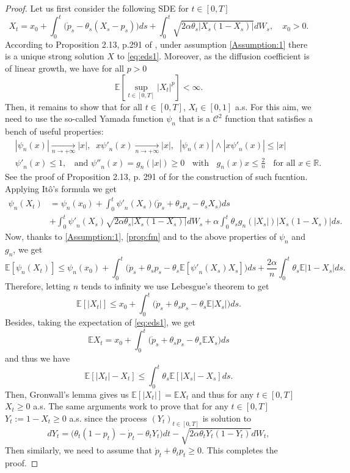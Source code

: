 \documentclass[11pt]{article}
\theoremstyle{definition}
\begin{document}
\begin{proof}
Let us first consider the following SDE for $t\in[0,T]$
\begin{equation}\label{eq:eds1}
X_t=x_0+  \int_0^t\big(\dot p_s - \theta_s(X_s-p_s)  \big)ds  + \int_0^t\sqrt{2\alpha \theta_s|X_s(1-X_s)|} dW_s, \quad x_0>0.
\end{equation}
According to Proposition 2.13, p.291 of \cite{KarShr}, under assumption  \eqref{Assumption:1} there is a unique strong solution $X$ to \eqref{eq:eds1}. Moreover, as the diffusion coefficient is of linear growth, we have  for all $p>0$ 
\begin{equation}\label{prop:fm}
\mathbb E[ \sup_{t\in[0,T]}|X_t|^p]<\infty.
\end{equation}
Then, it remains to show that for all $t\in[0,T]$, $X_t\in[0,1]$ a.s. For this aim, we need to use the so-called Yamada function $\psi_n$ that is a $\mathcal C^2$ function that satisfies a bench of useful properties:
\begin{align*}
&|\psi_n(x)|\underset{n\rightarrow+\infty}{\rightarrow}|x|, \;\; x{\psi'}_n(x)\underset{n\rightarrow+\infty}{\rightarrow}|x|, \;\; |\psi_n(x)|\wedge |x{\psi'}_n(x)| \le |x|\\
&{\psi'}_n(x)\le 1, \;\; \mbox{ and } {\psi''}_n(x)=g_n(|x|)\ge 0\;\; \mbox{ with } \;\; g_n(x)x\le \frac 2n\;\;  \mbox{ for all } x\in \mathbb R .
\end{align*}
See the proof of Proposition 2.13, p. 291 of \cite{KarShr} for the construction of such fucntion.
Applying Itô's formula we get
\begin{align*}
\psi_n(X_t)&=\psi_n(x_0) +\int_0^t {\psi'}_n(X_s)(\dot p_s + \theta_s p_s - \theta_sX_s  \big)ds \\
&+ \int_0^t{\psi'}_n(X_s)\sqrt{2\alpha \theta_s|X_s(1-X_s)|} dW_s + \alpha \int_0^t \theta_sg_n(|X_s|)|X_s(1-X_s)|ds.
\end{align*}
Now, thanks to  \eqref{Assumption:1}, \eqref{prop:fm} and to the above properties of $\psi_n$ and $g_n$, we get
$$
\mathbb E[\psi_n(X_t)]\le \psi_n(x_0) +\int_0^t \big(\dot p_s + \theta_sp_s -  \theta_s \mathbb E[{\psi'}_n(X_s)X_s] \big)ds + \frac{2\alpha}{n}\int_0^t \theta_s\mathbb E |1-X_s|ds.
$$
Therefore, letting $n$ tends to infinity we use Lebesgue's theorem to get
$$
\mathbb E[|X_t|]\le x_0 +\int_0^t \big(\dot p_s + \theta_sp_s -  \theta_s \mathbb E|X_s| \big)ds.
$$
Besides, taking the expectation of \eqref{eq:eds1}, we get
$$
\mathbb E X_t=x_0+  \int_0^t\big(\dot p_s +\theta_sp_s - \theta_s \mathbb EX_s  \big)ds
$$
and thus we have 
$$
\mathbb E[|X_t| -X_t ]\le \int_0^t \theta_s \mathbb E[|X_s| - X_s ]ds.
$$
Then, Gronwall's lemma gives us $\mathbb E[|X_t|]=\mathbb E X_t$ and thus for any $t\in[0,T]$ $X_t\ge0$ a.s. The same arguments work to prove that  for any $t\in[0,T]$ $Y_t:=1-X_t\ge0$  a.s.  since the process $(Y_t)_{t\in[0,T]}$ is solution to 
$$
dY_t= \big( \theta_t(1-p_t) -\dot p_t - \theta_tY_t  \big)dt  -\sqrt{2\alpha \theta_tY_t(1-Y_t)} dW_t,
$$
Then similarly, we need to assume that $\dot p_t +\theta_tp_t\ge 0$. This completes the proof.
\end{proof}
\end{document}
